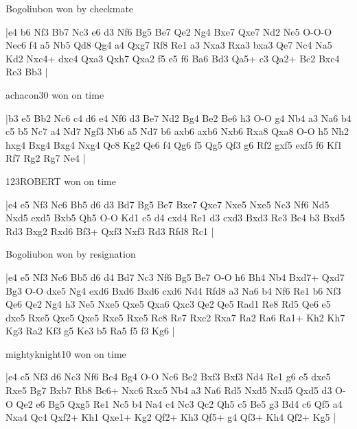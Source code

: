 \showboard

Bogoliubon won by checkmate

\makegametitle
|e4 b6 Nf3 Bb7 Nc3 e6 d3 Nf6 Bg5 Be7 Qe2 Ng4 Bxe7 Qxe7 Nd2 Ne5 O-O-O Nec6 f4 a5 Nb5 Qd8 Qg4 a4 Qxg7 Rf8 Re1 a3 Nxa3 Rxa3 bxa3 Qe7 Nc4 Na5 Kd2 Nxc4+ dxc4 Qxa3 Qxh7 Qxa2 f5 e5 f6 Ba6 Bd3 Qa5+ c3 Qa2+ Bc2 Bxc4 Re3 Bb3  |

\showboard

achacon30 won on time

\makegametitle
|b3 e5 Bb2 Nc6 c4 d6 e4 Nf6 d3 Be7 Nd2 Bg4 Be2 Be6 h3 O-O g4 Nb4 a3 Na6 b4 c5 b5 Nc7 a4 Nd7 Ngf3 Nb6 a5 Nd7 b6 axb6 axb6 Nxb6 Rxa8 Qxa8 O-O h5 Nh2 hxg4 Bxg4 Bxg4 Nxg4 Qc8 Kg2 Qe6 f4 Qg6 f5 Qg5 Qf3 g6 Rf2 gxf5 exf5 f6 Kf1 Rf7 Rg2 Rg7 Ne4  |

\showboard

123ROBERT won on time

\makegametitle
|e4 e5 Nf3 Nc6 Bb5 d6 d3 Bd7 Bg5 Be7 Bxe7 Qxe7 Nxe5 Nxe5 Nc3 Nf6 Nd5 Nxd5 exd5 Bxb5 Qh5 O-O Kd1 c5 d4 cxd4 Re1 d3 cxd3 Bxd3 Re3 Bc4 b3 Bxd5 Rd3 Bxg2 Rxd6 Bf3+ Qxf3 Nxf3 Rd3 Rfd8 Rc1  |

\showboard

Bogoliubon won by resignation

\makegametitle
|e4 e5 Nf3 Nc6 Bb5 d6 d4 Bd7 Nc3 Nf6 Bg5 Be7 O-O h6 Bh4 Nb4 Bxd7+ Qxd7 Bg3 O-O dxe5 Ng4 exd6 Bxd6 Bxd6 cxd6 Nd4 Rfd8 a3 Na6 b4 Nf6 Re1 b6 Nf3 Qe6 Qe2 Ng4 h3 Ne5 Nxe5 Qxe5 Qxa6 Qxc3 Qe2 Qe5 Rad1 Re8 Rd5 Qe6 e5 dxe5 Rxe5 Qxe5 Qxe5 Rxe5 Rxe5 Rc8 Re7 Rxc2 Rxa7 Ra2 Ra6 Ra1+ Kh2 Kh7 Kg3 Ra2 Kf3 g5 Ke3 b5 Ra5 f5 f3 Kg6  |

\showboard

mightyknight10 won on time

\makegametitle
|e4 c5 Nf3 d6 Nc3 Nf6 Bc4 Bg4 O-O Nc6 Be2 Bxf3 Bxf3 Nd4 Re1 g6 e5 dxe5 Rxe5 Bg7 Bxb7 Rb8 Bc6+ Nxc6 Rxc5 Nb4 a3 Na6 Rd5 Nxd5 Nxd5 Qxd5 d3 O-O Qe2 e6 Bg5 Qxg5 Re1 Nc5 b4 Na4 c4 Nc3 Qc2 Qh5 c5 Be5 g3 Bd4 c6 Qf5 a4 Nxa4 Qc4 Qxf2+ Kh1 Qxe1+ Kg2 Qf2+ Kh3 Qf5+ g4 Qf3+ Kh4 Qf2+ Kg5  |

\showboard

